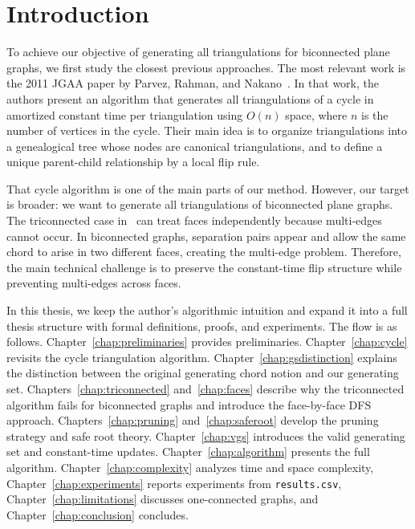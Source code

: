 \documentclass[12pt,a4paper]{report}
\theoremstyle{definition}
\theoremstyle{remark}
\begin{document}
\tableofcontents
\listoffigures
\listofalgorithms
\clearpage


\chapter{Introduction}
\label{chap:introduction}

To achieve our objective of generating all triangulations for biconnected plane graphs,
we first study the closest previous approaches. The most relevant work is the 2011 JGAA
paper by Parvez, Rahman, and Nakano~\cite{parvez2011}. In that work, the authors present
an algorithm that generates all triangulations of a cycle in amortized constant time per
triangulation using $O(n)$ space, where $n$ is the number of vertices in the cycle. Their
main idea is to organize triangulations into a genealogical tree whose nodes are canonical
triangulations, and to define a unique parent-child relationship by a local flip rule.

That cycle algorithm is one of the main parts of our method. However, our target is
broader: we want to generate all triangulations of biconnected plane graphs. The
triconnected case in~\cite{parvez2011} can treat faces independently because multi-edges
cannot occur. In biconnected graphs, separation pairs appear and allow the same chord to
arise in two different faces, creating the multi-edge problem. Therefore, the main
technical challenge is to preserve the constant-time flip structure while preventing
multi-edges across faces.

In this thesis, we keep the author's algorithmic intuition and expand it into a full
thesis structure with formal definitions, proofs, and experiments. The flow is as
follows. Chapter~\ref{chap:preliminaries} provides preliminaries.
Chapter~\ref{chap:cycle} revisits the cycle triangulation algorithm.
Chapter~\ref{chap:gsdistinction} explains the distinction between the original generating
chord notion and our generating set. Chapters~\ref{chap:triconnected}
and~\ref{chap:faces} describe why the triconnected algorithm fails for biconnected graphs
and introduce the face-by-face DFS approach. Chapters~\ref{chap:pruning}
and~\ref{chap:saferoot} develop the pruning strategy and safe root theory.
Chapter~\ref{chap:vgs} introduces the valid generating set and constant-time updates.
Chapter~\ref{chap:algorithm} presents the full algorithm.
Chapter~\ref{chap:complexity} analyzes time and space complexity,
Chapter~\ref{chap:experiments} reports experiments from \texttt{results.csv},
Chapter~\ref{chap:limitations} discusses one-connected graphs,
and Chapter~\ref{chap:conclusion} concludes.
\end{document}
